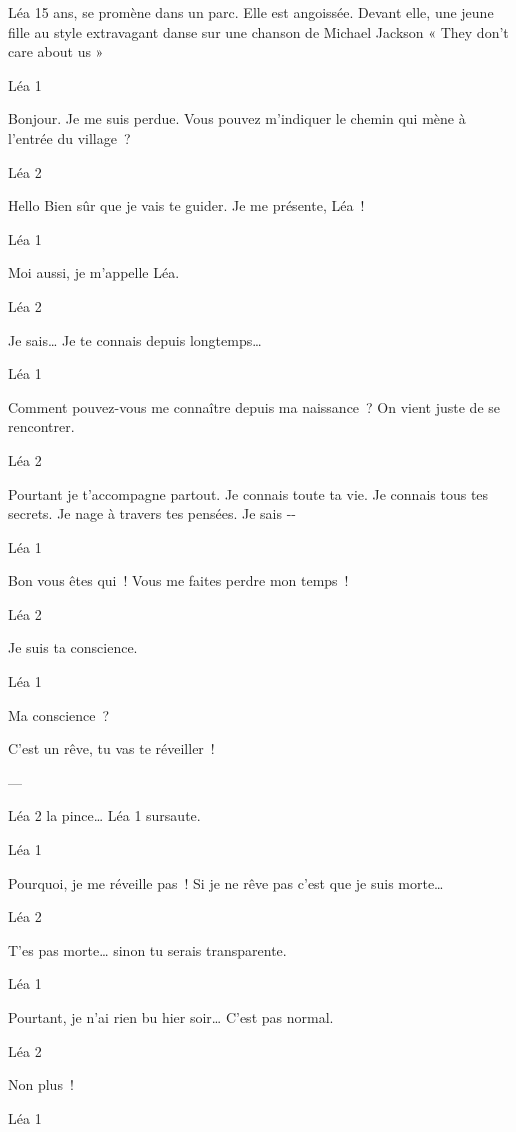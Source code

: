 \documentclass{frscenario}
\begin{document}

Léa 15 ans, se promène dans un parc. Elle est angoissée. Devant elle, une jeune fille au style extravagant danse sur une chanson de Michael Jackson « They don’t care about us »

\— Léa 1

Bonjour. Je me suis perdue. Vous pouvez m’indiquer le chemin qui mène à l’entrée du village ?

\— Léa 2

Hello
Bien sûr que je vais te guider. Je me présente, Léa !

\— Léa 1

Moi aussi, je m’appelle Léa.

\— Léa 2

Je sais… Je te connais depuis longtemps…

\— Léa 1

Comment pouvez-vous me connaître depuis ma naissance ? On vient juste de se rencontrer.

\— Léa 2

Pourtant je t’accompagne partout. Je connais toute ta vie. Je connais tous tes secrets. Je nage à travers tes pensées. Je sais -{}-

\— Léa 1


Bon vous êtes qui ! Vous me faites perdre mon temps !

\— Léa 2

Je suis ta conscience.

\— Léa 1

Ma conscience ?

C’est un rêve, tu vas te réveiller !

\——

Léa 2 la pince… Léa 1 sursaute.

\— Léa 1

Pourquoi, je me réveille pas !
Si je ne rêve pas c’est que je suis morte…

\— Léa 2

T’es pas morte… sinon tu serais transparente.

\— Léa 1

Pourtant, je n’ai rien bu hier soir… C’est pas normal.

\— Léa 2

Non plus !

\— Léa 1
\end{document}
